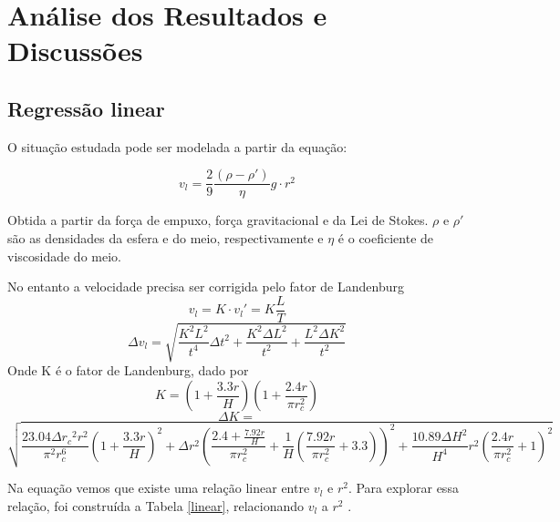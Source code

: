 \documentclass[12pt,a4paper]{article}
\begin{document}
\section{Análise dos Resultados e Discussões}
\subsection{Regressão linear}
O situação estudada pode ser modelada a partir da equação: 

$$ v_l = \frac{2}{9} \frac{(\rho - \rho ')}{\eta}g \cdot r^2$$

Obtida a partir da força de empuxo, força gravitacional e da Lei de Stokes. $\rho$ e $\rho '$ são as densidades da esfera e do meio, respectivamente e $\eta$ é o coeficiente de viscosidade do meio.

No entanto a velocidade precisa ser corrigida pelo fator de Landenburg
$$ v_l = K \cdot v_l ' = K \frac{L}{T}$$
$$ \Delta v_l = \sqrt{\frac{K^{2} L^{2}}{t^{4}} \Delta{t}^{2} + \frac{K^{2} \Delta{L}^{2}}{t^{2}} + \frac{L^{2} \Delta{K}^{2}}{t^{2}}} $$
Onde K é o fator de Landenburg, dado por 
$$ K = \left(1 + \frac{3.3 r}{H}\right) \left(1 + \frac{2.4 r}{ \pi r_{c}^{2}}  \right) $$
$$ \Delta K = $$
$$\sqrt{\frac{23.04 \Delta{r_{c}}^{2} r^{2}}{\pi^{2} r_{c}^{6}} \left(1 + \frac{3.3 r}{H}\right)^{2} + \Delta{r}^{2} \left(\frac{2.4 + \frac{7.92 r}{H}}{\pi r_{c}^{2}} + \frac{1}{H} \left(\frac{7.92 r}{\pi r_{c}^{2}} + 3.3\right)\right)^{2} + \frac{10.89 \Delta{H}^{2}}{H^{4}} r^{2} \left(\frac{2.4 r}{\pi r_{c}^{2}} + 1\right)^{2}} $$




Na equação  vemos que existe uma relação linear entre $v_l$ e $r^2$. Para explorar essa relação, foi construída a Tabela \ref{linear}, relacionando $v_l$ a $ r^2 $ .
\end{document}
